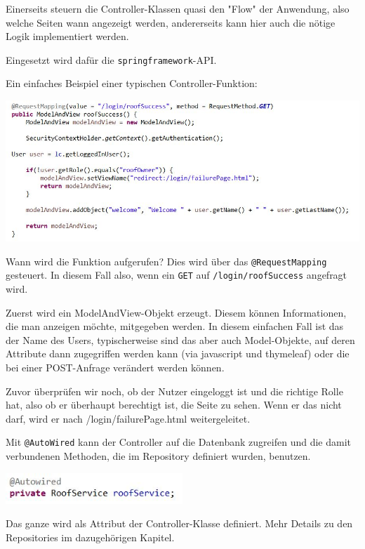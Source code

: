 \documentclass[12pt,a4paper]{article}
\begin{document}
Einerseits steuern die Controller-Klassen quasi den "Flow"{} der Anwendung, also welche Seiten wann angezeigt werden, andererseits kann hier auch die nötige Logik implementiert werden.

Eingesetzt wird dafür die \texttt{springframework}-API.

\bigskip
Ein einfaches Beispiel einer typischen Controller-Funktion:

\bigskip
\hspace{-1cm}\includegraphics[scale=0.9]{./Graphics/controller_back}

\bigskip
Wann wird die Funktion aufgerufen? Dies wird über das \texttt{@RequestMapping} gesteuert. In diesem Fall also, wenn ein \texttt{GET} auf \texttt{/login/roofSuccess} angefragt wird.

\smallskip
Zuerst wird ein ModelAndView-Objekt erzeugt. Diesem können Informationen, die man anzeigen möchte, mitgegeben werden. In diesem einfachen Fall ist das der Name des Users, typischerweise sind das aber auch Model-Objekte, auf deren Attribute dann zugegriffen werden kann (via javascript und thymeleaf) oder die bei einer POST-Anfrage verändert werden können.

\smallskip
Zuvor überprüfen wir noch, ob der Nutzer eingeloggt ist und die richtige Rolle hat, also ob er überhaupt berechtigt ist, die Seite zu sehen. Wenn er das nicht darf, wird er nach /login/failurePage.html weitergeleitet.

\bigskip
\bigskip
Mit \texttt{@AutoWired} kann der Controller auf die Datenbank zugreifen und die damit verbundenen Methoden, die im Repository definiert wurden, benutzen.

\bigskip
\includegraphics[width=0.5\textwidth]{./Graphics/autowired}

\bigskip
Das ganze wird als Attribut der Controller-Klasse definiert. Mehr Details zu den Repositories im dazugehörigen Kapitel.
\end{document}
